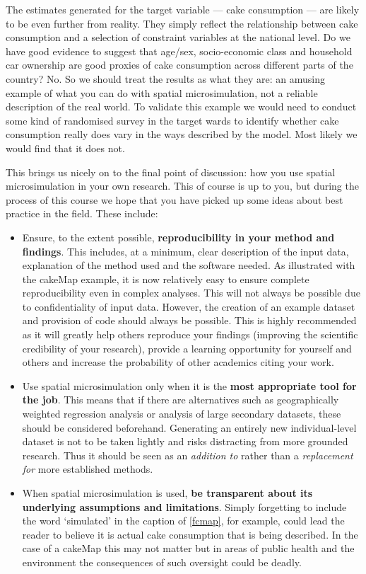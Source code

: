 \documentclass[a4paper, 11pt, twoside]{article}
\begin{document}
The estimates generated for the target variable --- cake consumption --- are likely to be
even further from reality. They simply reflect the relationship between cake consumption and
a selection of constraint variables at the national level. Do we have good evidence to suggest
that age/sex, socio-economic class and household car ownership are good proxies of cake consumption
across different parts of the country? No. So we should treat the results as what they are:
an amusing example of what you can do with spatial microsimulation, not a reliable description
of the real world. To validate this example we would need to conduct some kind of randomised
survey in the target wards to identify whether cake consumption really does vary in the ways
described by the model. Most likely we would find that it does not.

This brings us nicely on to the final point of discussion: how you use spatial microsimulation in
your own research. This of course is up to you, but during the process of this course we hope that
you have picked up some ideas about best practice in the field. These include:
\begin{itemize}
 \item Ensure, to the extent possible, \textbf{reproducibility in your method and findings}. This includes, at a minimum,
clear description of the input data, explanation of the method used and the software needed. As illustrated
with the cakeMap example, it is now relatively easy to ensure complete reproducibility even in complex analyses.
This will not always be possible due to confidentiality of input data. However, the creation of an example dataset
and provision of code should always be possible. This is highly recommended as it will greatly help others reproduce
your findings (improving the scientific credibility of your research), provide a learning opportunity for yourself and
others and increase the probability of other academics citing your work.
 \item Use spatial microsimulation only when it is the \textbf{most appropriate tool for the job}. 
This means that if there are alternatives such as geographically weighted regression analysis
or analysis of large secondary datasets, these should be considered beforehand. Generating an entirely
new individual-level dataset is not to be taken lightly and risks distracting from more grounded research.
Thus it should be seen as an \emph{addition to} rather than a \emph{replacement for} more established methods.
\item When spatial microsimulation is used, \textbf{be transparent about its underlying assumptions and limitations}.
Simply forgetting to include the word `simulated' in the caption of \cref{fcmap}, for example, could lead
the reader to believe it is actual cake consumption that is being described. In the case
of a cakeMap this may not matter but in areas of public health and the environment the consequences
of such oversight could be deadly.
\end{itemize}
\end{document}
